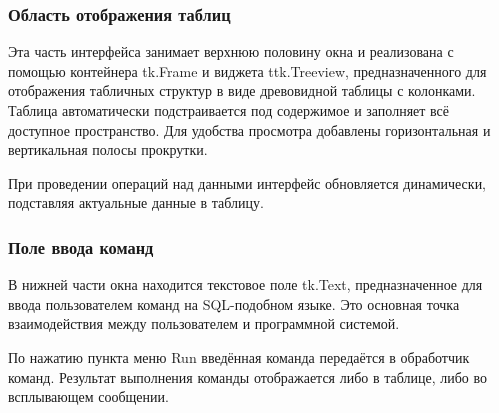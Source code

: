 \subsubsection{Область отображения таблиц}
	
Эта часть интерфейса занимает верхнюю половину окна и реализована с помощью контейнера tk.Frame и виджета ttk.Treeview, предназначенного для отображения табличных структур в виде древовидной таблицы с колонками. Таблица автоматически подстраивается под содержимое и заполняет всё доступное пространство. Для удобства просмотра добавлены горизонтальная и вертикальная полосы прокрутки.
	
При проведении операций над данными интерфейс обновляется динамически, подставляя актуальные данные в таблицу.
	
\subsubsection{Поле ввода команд}
	
В нижней части окна находится текстовое поле tk.Text, предназначенное для ввода пользователем команд на SQL-подобном языке. Это основная точка взаимодействия между пользователем и программной системой.
	
По нажатию пункта меню Run введённая команда передаётся в обработчик команд. Результат выполнения команды отображается либо в таблице, либо во всплывающем сообщении.

